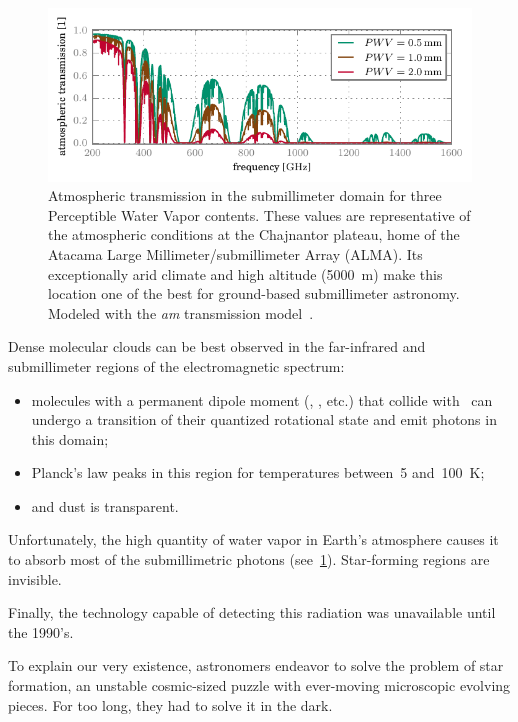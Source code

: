 \begin{figure}
    \centering
    \includegraphics{atmos_trans}
    \caption{
        Atmospheric transmission in the submillimeter domain
        for three Perceptible Water Vapor contents.
        These values are representative of the atmospheric conditions
        at the Chajnantor plateau, home of the
        Atacama Large Millimeter/submillimeter Array (ALMA).
        Its exceptionally arid climate and high altitude (\SI{5000}{\meter}) make
        this location
        one of the best for ground-based submillimeter astronomy.
        Modeled with the \textit{am} transmission model~\parencite{pardo2001atmospheric}.
    }
    \label{fig:atmospheric_electromagnetic_transmission}
\end{figure}

\begin{samepage}
Dense molecular clouds can be best observed in the far-infrared and submillimeter regions of the electromagnetic spectrum:
\begin{itemize}
    \item molecules with a permanent dipole moment (, , etc.) that collide with~ can undergo a transition of their quantized rotational state and emit photons in this domain;
    \item Planck's law peaks in this region for temperatures between~\num{5} and~\SI{100}{\kelvin};
    \item and dust is transparent.
\end{itemize}
\end{samepage}
Unfortunately, the high quantity of water vapor in Earth's atmosphere causes it to absorb most of the submillimetric photons (see~\cref{fig:atmospheric_electromagnetic_transmission}).
Star-forming regions are invisible.

Finally, the technology capable of detecting this radiation was unavailable until the 1990's.

To explain our very existence, astronomers endeavor to solve the problem of star formation,
an unstable cosmic-sized puzzle with ever-moving microscopic evolving pieces.
For too long, they had to solve it in the dark.

